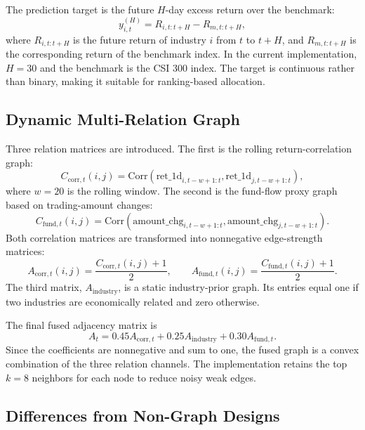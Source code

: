\documentclass[12pt]{article}
\begin{document}
The prediction target is the future $H$-day excess return over the benchmark:
\begin{equation}
y_{i,t}^{(H)}=R_{i,t:t+H}-R_{m,t:t+H},
\end{equation}
where $R_{i,t:t+H}$ is the future return of industry $i$ from $t$ to $t+H$, and $R_{m,t:t+H}$ is the corresponding return of the benchmark index. In the current implementation, $H=30$ and the benchmark is the CSI 300 index. The target is continuous rather than binary, making it suitable for ranking-based allocation.

\subsection{Dynamic Multi-Relation Graph}

Three relation matrices are introduced. The first is the rolling return-correlation graph:
\begin{equation}
C_{\mathrm{corr},t}(i,j)=
\mathrm{Corr}\left(\text{ret\_1d}_{i,t-w+1:t},\text{ret\_1d}_{j,t-w+1:t}\right),
\end{equation}
where $w=20$ is the rolling window. The second is the fund-flow proxy graph based on trading-amount changes:
\begin{equation}
C_{\mathrm{fund},t}(i,j)=
\mathrm{Corr}\left(\text{amount\_chg}_{i,t-w+1:t},\text{amount\_chg}_{j,t-w+1:t}\right).
\end{equation}
Both correlation matrices are transformed into nonnegative edge-strength matrices:
\begin{equation}
A_{\mathrm{corr},t}(i,j)=\frac{C_{\mathrm{corr},t}(i,j)+1}{2}, \qquad
A_{\mathrm{fund},t}(i,j)=\frac{C_{\mathrm{fund},t}(i,j)+1}{2}.
\end{equation}
The third matrix, $A_{\mathrm{industry}}$, is a static industry-prior graph. Its entries equal one if two industries are economically related and zero otherwise.

The final fused adjacency matrix is
\begin{equation}
A_t=0.45A_{\mathrm{corr},t}+0.25A_{\mathrm{industry}}+0.30A_{\mathrm{fund},t}.
\label{eq:fusion}
\end{equation}
Since the coefficients are nonnegative and sum to one, the fused graph is a convex combination of the three relation channels. The implementation retains the top $k=8$ neighbors for each node to reduce noisy weak edges.

\subsection{Differences from Non-Graph Designs}
\end{document}
